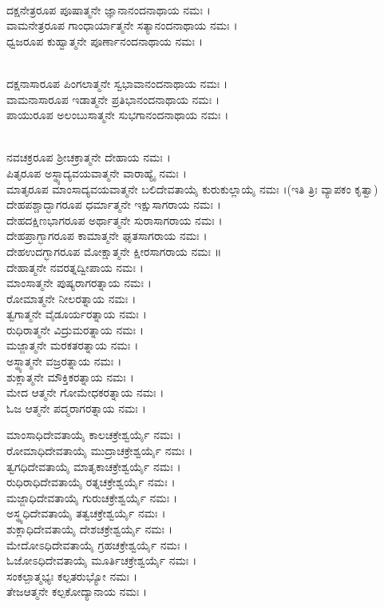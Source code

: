 \\
ದಕ್ಷನೇತ್ರರೂಪ ಪೂಷಾತ್ಮನೇ ಜ್ಞಾನಾನಂದನಾಥಾಯ ನಮಃ ।\\
ವಾಮನೇತ್ರರೂಪ ಗಾಂಧಾರ್ಯಾತ್ಮನೇ ಸತ್ಯಾನಂದನಾಥಾಯ ನಮಃ ।\\
ಧ್ವಜರೂಪ ಕುಹ್ವಾತ್ಮನೇ ಪೂರ್ಣಾನಂದನಾಥಾಯ ನಮಃ ।

\\
ದಕ್ಷನಾಸಾರೂಪ ಪಿಂಗಲಾತ್ಮನೇ ಸ್ವಭಾವಾನಂದನಾಥಾಯ ನಮಃ ।\\
ವಾಮನಾಸಾರೂಪ ಇಡಾತ್ಮನೇ ಪ್ರತಿಭಾನಂದನಾಥಾಯ ನಮಃ ।\\
ಪಾಯುರೂಪ ಅಲಂಬುಸಾತ್ಮನೇ ಸುಭಗಾನಂದನಾಥಾಯ ನಮಃ ।

\\
ನವಚಕ್ರರೂಪ ಶ್ರೀಚಕ್ರಾತ್ಮನೇ ದೇಹಾಯ ನಮಃ ।\\
ಪಿತೃರೂಪ ಅಸ್ಥ್ಯಾದ್ಯವಯವಾತ್ಮನೇ ವಾರಾಹ್ಯೈ ನಮಃ ।\\
ಮಾತೃರೂಪ ಮಾಂಸಾದ್ಯವಯವಾತ್ಮನೇ ಬಲಿದೇವತಾಯೈ ಕುರುಕುಲ್ಲಾಯೈ ನಮಃ ।(ಇತಿ ತ್ರಿಃ ವ್ಯಾಪಕಂ ಕೃತ್ವಾ)\\
ದೇಹಪಶ್ಚಾದ್ಭಾಗರೂಪ ಧರ್ಮಾತ್ಮನೇ ಇಕ್ಷುಸಾಗರಾಯ ನಮಃ ।\\
ದೇಹದಕ್ಷಿಣಭಾಗರೂಪ ಅರ್ಥಾತ್ಮನೇ ಸುರಾಸಾಗರಾಯ ನಮಃ ।\\
ದೇಹಪ್ರಾಗ್ಭಾಗರೂಪ ಕಾಮಾತ್ಮನೇ ಘೃತಸಾಗರಾಯ ನಮಃ ।\\
ದೇಹಉದಗ್ಭಾಗರೂಪ ಮೋಕ್ಷಾತ್ಮನೇ ಕ್ಷೀರಸಾಗರಾಯ ನಮಃ ॥\\
ದೇಹಾತ್ಮನೇ ನವರತ್ನದ್ವೀಪಾಯ ನಮಃ ।\\
ಮಾಂಸಾತ್ಮನೇ ಪುಷ್ಯರಾಗರತ್ನಾಯ ನಮಃ ।\\
ರೋಮಾತ್ಮನೇ ನೀಲರತ್ನಾಯ ನಮಃ ।\\
ತ್ವಗಾತ್ಮನೇ ವೈಡೂರ್ಯರತ್ನಾಯ ನಮಃ ।\\
ರುಧಿರಾತ್ಮನೇ ವಿದ್ರುಮರತ್ನಾಯ ನಮಃ ।\\
ಮಜ್ಜಾತ್ಮನೇ ಮರಕತರತ್ನಾಯ ನಮಃ ।\\
ಅಸ್ಥ್ಯಾತ್ಮನೇ ವಜ್ರರತ್ನಾಯ ನಮಃ ।\\
ಶುಕ್ಲಾತ್ಮನೇ ಮೌಕ್ತಿಕರತ್ನಾಯ ನಮಃ ।\\
ಮೇದ ಆತ್ಮನೇ ಗೋಮೇಧಕರತ್ನಾಯ ನಮಃ ।\\
ಓಜ ಆತ್ಮನೇ ಪದ್ಮರಾಗರತ್ನಾಯ ನಮಃ ।

ಮಾಂಸಾಧಿದೇವತಾಯೈ ಕಾಲಚಕ್ರೇಶ್ವರ್ಯೈ ನಮಃ ।\\
ರೋಮಾಧಿದೇವತಾಯೈ ಮುದ್ರಾಚಕ್ರೇಶ್ವರ್ಯೈ ನಮಃ ।\\
ತ್ವಗಧಿದೇವತಾಯೈ ಮಾತೃಕಾಚಕ್ರೇಶ್ವರ್ಯೈ ನಮಃ ।\\
ರುಧಿರಾಧಿದೇವತಾಯೈ ರತ್ನಚಕ್ರೇಶ್ವರ್ಯೈ ನಮಃ ।\\
ಮಜ್ಜಾಧಿದೇವತಾಯೈ ಗುರುಚಕ್ರೇಶ್ವರ್ಯೈ ನಮಃ ।\\
ಅಸ್ಥ್ಯಧಿದೇವತಾಯೈ ತತ್ವಚಕ್ರೇಶ್ವರ್ಯೈ ನಮಃ ।\\
ಶುಕ್ಲಾಧಿದೇವತಾಯೈ ದೇಶಚಕ್ರೇಶ್ವರ್ಯೈ ನಮಃ ।\\
ಮೇದೋಽಧಿದೇವತಾಯೈ ಗ್ರಹಚಕ್ರೇಶ್ವರ್ಯೈ ನಮಃ ।\\
ಓಜೋಽಧಿದೇವತಾಯೈ ಮೂರ್ತಿಚಕ್ರೇಶ್ವರ್ಯೈ ನಮಃ ।\\
ಸಂಕಲ್ಪಾತ್ಮಭ್ಯಃ ಕಲ್ಪತರುಭ್ಯೋ ನಮಃ ।\\
ತೇಜಆತ್ಮನೇ ಕಲ್ಪಕೋದ್ಯಾನಾಯ ನಮಃ ।

